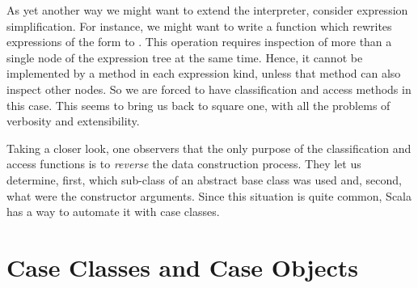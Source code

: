 \documentclass[a4paper,12pt,twoside,titlepage]{book}
\begin{document}
As yet another way we might want to extend the interpreter, consider
expression simplification. For instance, we might want to write a
function which rewrites expressions of the form
 to . This operation requires inspection of 
more than a single node of the expression tree at the same
time. Hence, it cannot be implemented by a method in each expression
kind, unless that method can also inspect other nodes. So we are
forced to have classification and access methods in this case. This
seems to bring us back to square one, with all the problems of
verbosity and extensibility.

Taking a closer look, one observers that the only purpose of the
classification and access functions is to {\em reverse} the data
construction process.  They let us determine, first, which sub-class
of an abstract base class was used and, second, what were the
constructor arguments. Since this situation is quite common, Scala has
a way to automate it with case classes. 

\section{Case Classes and Case Objects}
\end{document}
